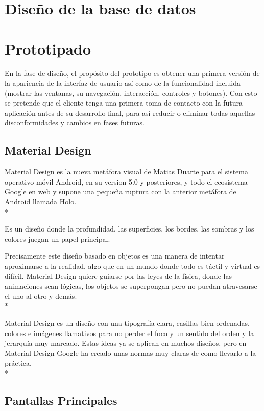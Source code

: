 \documentclass[../pfc.tex]{subfiles}
\begin{document}
	\section{Diseño de la base de datos}

	
	\section{Prototipado}
	
	En la fase de diseño, el propósito del prototipo es obtener una primera versión de la apariencia de la interfaz de usuario así como de la funcionalidad incluida (mostrar las ventanas, su navegación, interacción, controles y botones). Con esto se pretende que el cliente tenga una primera toma de contacto con la futura aplicación antes de su desarrollo final, para así reducir o eliminar todas aquellas disconformidades y cambios en fases futuras.
	
		\subsection{Material Design}
		Material Design es la nueva metáfora visual de Matias Duarte para el sistema operativo móvil Android, en su version 5.0 y posteriores, y todo el ecosistema Google en web y supone una pequeña ruptura con la anterior metáfora de Android llamada Holo. \\*
		
		Es un diseño donde la profundidad, las superficies, los bordes, las sombras y los colores juegan un papel principal.
		
		Precisamente este diseño basado en objetos es una manera de intentar aproximarse a la realidad, algo que en un mundo donde todo es táctil y virtual es difícil. Material Design quiere guiarse por las leyes de la física, donde las animaciones sean lógicas, los objetos se superpongan pero no puedan atravesarse el uno al otro y demás.\\*
		
		Material Design es un diseño con una tipografía clara, casillas bien ordenadas, colores e imágenes llamativos para no perder el foco y un sentido del orden y la jerarquía muy marcado. Estas ideas ya se aplican en muchos diseños, pero en Material Design Google ha creado unas normas muy claras de como llevarlo a la práctica.\\*
		
		\subsection{Pantallas Principales}
		
\end{document}
